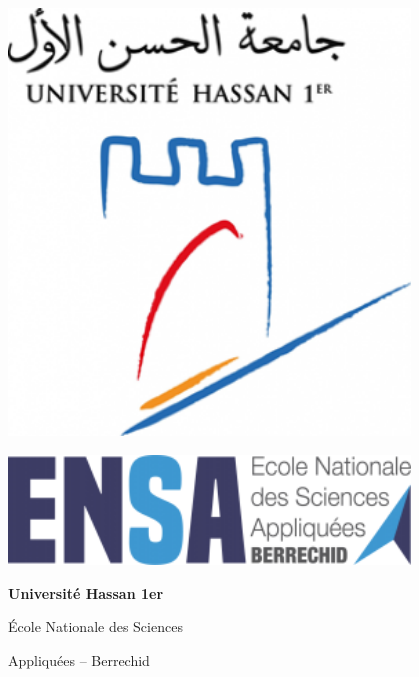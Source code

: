\documentclass[12pt,a4paper]{article}
\begin{document}
\begin{titlepage}
    \centering

    \begin{minipage}{0.45\textwidth}
        \centering
        \includegraphics[width=0.8\textwidth]{Application ensab + guides/ensab_v2/vendor/img/uh1.png}
    \end{minipage}
    \hfill
    \begin{minipage}{0.45\textwidth}
        \centering
        \includegraphics[width=0.8\textwidth]{Application ensab + guides/ensab_v2/vendor/img/ensa.png}
    \end{minipage}

    \vspace{2cm}

    {\LARGE\bfseries Université Hassan 1er\par}
    \vspace{0.5cm}
    {\Large École Nationale des Sciences\par}
    {\Large Appliquées -- Berrechid\par}

    \vspace{3cm}


\end{titlepage}
\end{document}
